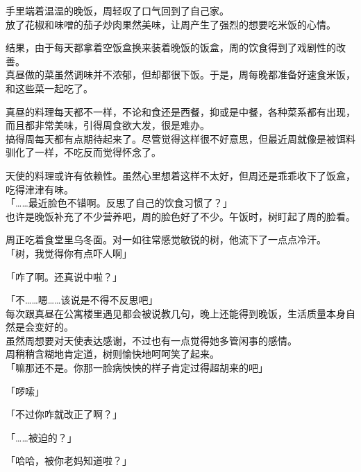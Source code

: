 手里端着温温的晚饭，周轻叹了口气回到了自己家。\\

放了花椒和味噌的茄子炒肉果然美味，让周产生了强烈的想要吃米饭的心情。\\

\vspace{2\baselineskip}

结果，由于每天都拿着空饭盒换来装着晚饭的饭盒，周的饮食得到了戏剧性的改善。\\

真昼做的菜虽然调味并不浓郁，但却都很下饭。于是，周每晚都准备好速食米饭，和这些菜一起吃了。

真昼的料理每天都不一样，不论和食还是西餐，抑或是中餐，各种菜系都有出现，而且都非常美味，引得周食欲大发，很是难办。\\

搞得周每天都有点期待起来了。尽管觉得这样很不好意思，但最近周就像是被饵料驯化了一样，不吃反而觉得怀念了。

天使的料理或许有依赖性。虽然心里想着这样不太好，但周还是乖乖收下了饭盒，吃得津津有味。\\

「……最近脸色不错啊。反思了自己的饮食习惯了？」\\

也许是晚饭补充了不少营养吧，周的脸色好了不少。午饭时，树盯起了周的脸看。

周正吃着食堂里乌冬面。对一如往常感觉敏锐的树，他流下了一点点冷汗。\\

「树，我觉得你有点吓人啊」

「咋了啊。还真说中啦？」

「不……嗯……该说是不得不反思吧」\\

每次跟真昼在公寓楼里遇见都会被说教几句，晚上还能得到晚饭，生活质量本身自然是会变好的。\\

虽然周想要对天使表达感谢，不过也有一点觉得她多管闲事的感情。\\

周稍稍含糊地肯定道，树则愉快地呵呵笑了起来。\\

「嘛那还不是。你那一脸病怏怏的样子肯定过得超胡来的吧」

「啰嗦」

「不过你咋就改正了啊？」

「……被迫的？」

「哈哈，被你老妈知道啦？」


